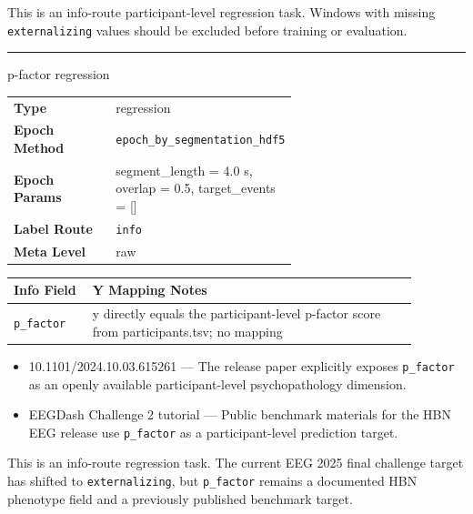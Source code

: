 {\begin{tcolorbox}
\begin{itemize}[leftmargin=1.3em,noitemsep,topsep=1pt]
\end{itemize}
\par{} {\footnotesize This is an info-route participant-level regression task. Windows with missing \texttt{externalizing} values should be excluded before training or evaluation.}
\noindent\rule{\linewidth}{0.7pt}\par\nopagebreak
{} {\footnotesize p-factor regression}\par\smallskip
{\footnotesize\begin{tabular}{@{}lp{0.62\linewidth}@{}}
\textbf{Type} & regression \\
\textbf{Epoch Method} & \texttt{epoch\_by\_segmentation\_hdf5} \\
\textbf{Epoch Params} & segment\_length = 4.0 s, overlap = 0.5, target\_events = [] \\
\textbf{Label Route} & \texttt{info} \\
\textbf{Meta Level} & raw \\
\end{tabular}}
\par{}\par\smallskip
\begingroup\footnotesize
\begin{tabular}{@{}p{0.1760\linewidth}p{0.7040\linewidth}@{}}
\toprule
\textbf{Info Field} & \textbf{Y Mapping Notes} \\
\midrule
\texttt{p\_factor} & y directly equals the participant-level p-factor score from participants.tsv; no mapping \\
\bottomrule
\end{tabular}
\endgroup
\par{}\par
\begin{itemize}[leftmargin=1.3em,noitemsep,topsep=1pt]
\item[\scriptsize$\cdot$] {\scriptsize 10.1101/2024.10.03.615261 --- The release paper explicitly exposes \texttt{p\_factor} as an openly available participant-level psychopathology dimension.}
\item[\scriptsize$\cdot$] {\scriptsize EEGDash Challenge 2 tutorial --- Public benchmark materials for the HBN EEG release use \texttt{p\_factor} as a participant-level prediction target.}
\end{itemize}
\par{} {\footnotesize This is an info-route regression task. The current EEG 2025 final challenge target has shifted to \texttt{externalizing}, but \texttt{p\_factor} remains a documented HBN phenotype field and a previously published benchmark target.}

\end{tcolorbox}}
